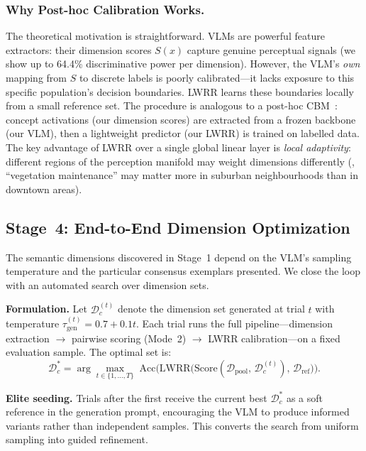 \documentclass[runningheads]{llncs}
\begin{document}
\subsubsection{Why Post-hoc Calibration Works.}

The theoretical motivation is straightforward.
VLMs are powerful feature extractors: their dimension scores $S(x)$ capture genuine perceptual signals (we show up to 64.4\% discriminative power per dimension).
However, the VLM's \emph{own} mapping from $S$ to discrete labels is poorly calibrated---it lacks exposure to this specific population's decision boundaries.
LWRR learns these boundaries locally from a small reference set.
The procedure is analogous to a post-hoc CBM~\cite{yuksekgonul2023posthoc}: concept activations (our dimension scores) are extracted from a frozen backbone (our VLM), then a lightweight predictor (our LWRR) is trained on labelled data.
The key advantage of LWRR over a single global linear layer is \emph{local adaptivity}: different regions of the perception manifold may weight dimensions differently (\eg, ``vegetation maintenance'' may matter more in suburban neighbourhoods than in downtown areas).

\subsection{Stage~4: End-to-End Dimension Optimization}
\label{sec:e2e_method}

The semantic dimensions discovered in Stage~1 depend on the VLM's sampling temperature and the particular consensus exemplars presented.
We close the loop with an automated search over dimension sets.

\smallskip\noindent\textbf{Formulation.}
Let $\mathcal{D}_c^{(t)}$ denote the dimension set generated at trial $t$ with temperature $\tau_{\mathrm{gen}}^{(t)} = 0.7 + 0.1t$.
Each trial runs the full pipeline---dimension extraction $\to$ pairwise scoring (Mode~2) $\to$ LWRR calibration---on a fixed evaluation sample.
The optimal set is:
\begin{equation}
\mathcal{D}_c^{*} = \arg\max_{t \in \{1,\ldots,T\}} \;\mathrm{Acc}\bigl(\text{LWRR}\bigl(\text{Score}(\mathcal{D}_{\mathrm{pool}},\, \mathcal{D}_c^{(t)}),\, \mathcal{D}_{\mathrm{ref}}\bigr)\bigr).
\label{eq:e2e}
\end{equation}

\smallskip\noindent\textbf{Elite seeding.}
Trials after the first receive the current best $\mathcal{D}_c^{*}$ as a soft reference in the generation prompt, encouraging the VLM to produce informed variants rather than independent samples.
This converts the search from uniform sampling into guided refinement.
\end{document}
